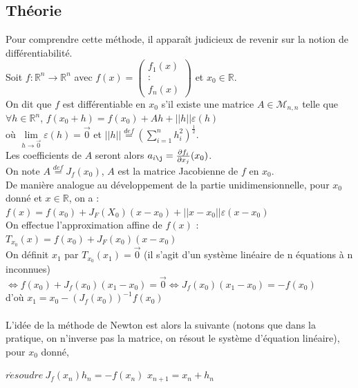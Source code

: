 \documentclass[a4paper,10pt]{report}
\begin{document}
\subsection{Théorie}
Pour comprendre cette méthode, il apparaît judicieux de revenir sur la notion de différentiabilité. \\
Soit $f : \mathbb{R}^n \longrightarrow \mathbb{R}^n$ avec $f(x) = \left( \begin{array}{c} f_{1}(x) \\ \colon \\ f_{n}(x) \end{array} \right)$ et $x_0\in\mathbb{R}$.\\
On dit que $f$ est différentiable en $x_0$ s'il existe une matrice $A \in \mathcal{M}_{n,n}$ telle que \\
$\forall h\in \mathbb{R}^n$, $f(x_0+h)=f(x_0)+Ah+||h||\varepsilon(h)$ \\ où $\lim\limits_{h \rightarrow \overrightarrow{0}} \varepsilon(h) = \overrightarrow{0}$ et $||h|| \overset{def}{=} \left( \sum \limits_{i=1}^n h_i^2 \right)^\frac{1}{2}$.\\
Les coefficients de $A$ seront alors $a_{i\j}=\frac{\partial f_i}{\partial x_j}(x_0)$.\\
On note $A \overset{def}{=} J_f(x_0)$, $A$ est la matrice Jacobienne de $f$ en $x_0$.\\
\indent De manière analogue au développement de la partie unidimensionnelle, pour $x_0$ donné et $x\in \mathbb{R}$, on a :\\
$f(x)=f(x_0)+J_F(X_0)(x-x_0) + ||x-x_0||\varepsilon(x-x_0)$\\
On effectue l'approximation affine de $f(x)$ : $T_{x_0}(x)=f(x_0)+J_F(x_0)(x-x_0)$\\
On définit $x_1$ par $T_{x_0}(x_1) = \overrightarrow{0}$ (il s'agit d'un système linéaire de n équations à n inconnues)\\
$\Leftrightarrow f(x_0) + J_f(x_0)(x_1-x_0)=\overrightarrow{0} \Leftrightarrow J_f(x_0)(x_1-x_0)=-f(x_0)$\\
d'où $x_1=x_0-\left( J_f(x_0) \right)^{-1}f(x_0)$\\ \\
\indent L'idée de la méthode de Newton est alors la suivante (notons que dans la pratique, on n'inverse pas la matrice, on résout le système d'équation linéaire), pour $x_0$ donné,

\begin{algorithm}
\begin{algorithmic}
\STATE $r\acute{e}soudre \ J_{f}(x_{n})h_{n}=-f(x_{n})$
\STATE $x_{n+1} =  x_{n}+h_{n}$
\ENDWHILE
\end{algorithmic}
\end{algorithm}
\end{document}
